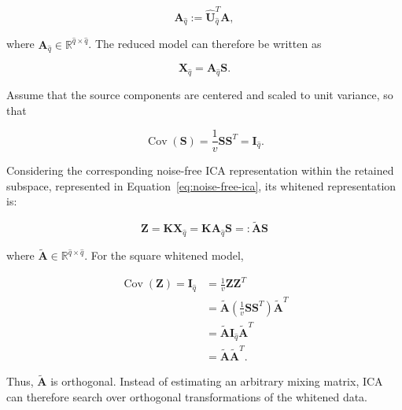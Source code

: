 \documentclass[english]{pwr_wmat_praca_dyplomowa}
\theoremstyle{definition}
\theoremstyle{remark}
\begin{document}
\begin{equation}
    \mathbf{A}_{\widehat{q}} := \widehat{\mathbf{U}}_{\widehat{q}}^T \mathbf{A},
\end{equation}

where $\mathbf{A}_{\widehat{q}} \in \mathbb{R}^{\widehat{q} \times \widehat{q}}$. The reduced model can therefore be written as

\begin{equation}
    \mathbf{X}_{\widehat{q}} = \mathbf{A}_{\widehat{q}}\mathbf{S}.
    \label{eq:noise-free-ica}
\end{equation}

Assume that the source components are centered and scaled to unit variance, so that

\begin{equation}
    \operatorname{Cov}(\mathbf{S}) = \frac{1}{v}\mathbf{S}\mathbf{S}^T = \mathbf{I}_{\widehat{q}}.
\end{equation}

Considering the corresponding noise-free ICA representation within the retained subspace, represented in Equation~\ref{eq:noise-free-ica}, its whitened representation is:

\begin{equation}
    \mathbf{Z} = \mathbf{K}\mathbf{X}_{\widehat{q}} = \mathbf{K}\mathbf{A}_{\widehat{q}}\mathbf{S} =: \widetilde{\mathbf{A}}\mathbf{S}
    \label{eq:whitened-data}
\end{equation}

where $\widetilde{\mathbf{A}} \in \mathbb{R}^{\widehat{q} \times \widehat{q}}$. For the square whitened model,

\begin{equation}
    \begin{aligned}
        \operatorname{Cov}\left(\mathbf{Z}\right) = \mathbf{I}_{\widehat{q}}
        &= \frac{1}{v} \mathbf{Z}\mathbf{Z}^T \\
        &= \widetilde{\mathbf{A}} \left(\frac{1}{v} \mathbf{S}\mathbf{S}^T \right) \widetilde{\mathbf{A}}^T \\
        &= \widetilde{\mathbf{A}} \mathbf{I}_{\widehat{q}} \widetilde{\mathbf{A}}^T \\
        &= \widetilde{\mathbf{A}} \widetilde{\mathbf{A}}^T. 
    \end{aligned}
\end{equation}

Thus, $\widetilde{\mathbf{A}}$ is orthogonal. Instead of estimating an arbitrary mixing matrix, ICA can therefore search over orthogonal transformations of the whitened data.
\end{document}
